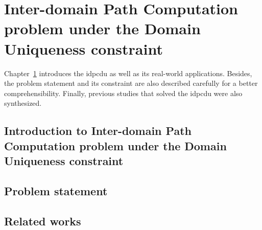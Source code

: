 \chapter{Inter-domain Path Computation problem under the Domain Uniqueness constraint}
\label{chap:chap2}
Chapter~\ref{chap:chap2} introduces the \acrfull{idpcdu} as well as its real-world applications. Besides, the problem statement and its constraint are also described carefully for a better comprehensibility. Finally, previous studies that solved the \gls{idpcdu} were also synthesized.

\section{Introduction to Inter-domain Path Computation problem under the Domain Uniqueness constraint}
\label{def:intro}


\section{Problem statement}
\label{def:statement}


\section{Related works}
\label{def:related}
